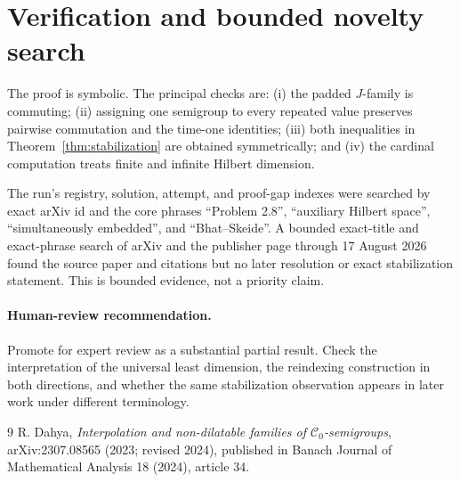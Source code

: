 \documentclass[11pt]{article}
\begin{document}
\section{Verification and bounded novelty search}

The proof is symbolic. The principal checks are: (i) the padded $J$-family is commuting;
(ii) assigning one semigroup to every repeated value preserves pairwise commutation and
the time-one identities; (iii) both inequalities in Theorem~\ref{thm:stabilization} are
obtained symmetrically; and (iv) the cardinal computation treats finite and infinite
Hilbert dimension.

The run's registry, solution, attempt, and proof-gap indexes were searched by exact arXiv
id and the core phrases ``Problem 2.8'', ``auxiliary Hilbert space'', ``simultaneously
embedded'', and ``Bhat--Skeide''. A bounded exact-title and exact-phrase search of arXiv
and the publisher page through 17 August 2026 found the source paper and citations but no
later resolution or exact stabilization statement. This is bounded evidence, not a
priority claim.

\paragraph{Human-review recommendation.}
Promote for expert review as a substantial partial result. Check the interpretation of the
universal least dimension, the reindexing construction in both directions, and whether the
same stabilization observation appears in later work under different terminology.

\begin{thebibliography}{9}
\small
{}
R. Dahya,
\emph{Interpolation and non-dilatable families of $\mathcal C_0$-semigroups},
arXiv:2307.08565 (2023; revised 2024), published in
Banach Journal of Mathematical Analysis 18 (2024), article 34.
\end{thebibliography}
\end{document}
